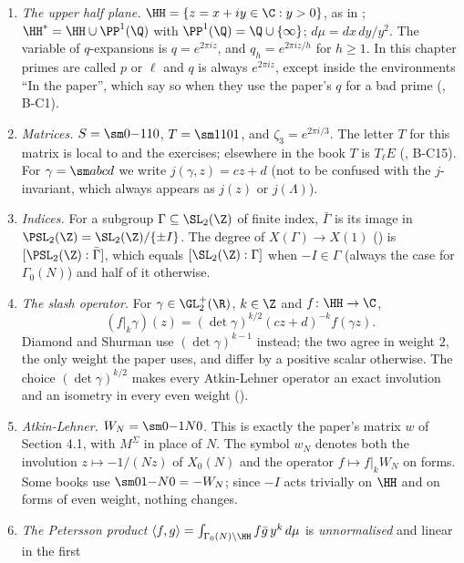 \begin{convention}\label{conv:modforms:conventions}
\leavevmode
\begin{enumerate}[label=(\alph*)]
\item \emph{The upper half plane.} $\HH=\{z=x+iy\in\C:y>0\}$, as in ; $\HH^*=\HH\cup\PP^1(\Q)$ with
$\PP^1(\Q)=\Q\cup\{\infty\}$; $d\mu=dx\,dy/y^2$. The variable of $q$-expansions is $q=e^{2\pi iz}$, and $q_h=e^{2\pi iz/h}$ for $h\ge1$. In
this chapter primes are called $p$ or $\ell$ and $q$ is always $e^{2\pi iz}$, except inside the environments ``In the paper'', which say
so when they use the paper's $q$ for a bad prime (, B-C1).
\item \emph{Matrices.} $S=\sm0{-1}10$, $T=\sm1101$, and $\zeta_3=e^{2\pi i/3}$. The letter $T$ for this matrix is local to
 and the exercises; elsewhere in the book $T$ is $T_\ell E$ (,
B-C15). For $\gamma=\sm abcd$ we write $j(\gamma,z)=cz+d$ (not to be confused with the $j$-invariant, which always appears as $j(z)$
or $j(\Lambda)$).
\item \emph{Indices.} For a subgroup $\Gamma\subseteq\SL_2(\Z)$ of finite index, $\bar\Gamma$ is its image in $\PSL_2(\Z)=\SL_2(\Z)/\{\pm I\}$. The degree
of $X(\Gamma)\to X(1)$ () is $[\PSL_2(\Z):\bar\Gamma]$, which equals $[\SL_2(\Z):\Gamma]$ when $-I\in\Gamma$ (always the case for
$\Gamma_0(N)$) and half of it otherwise.
\item \emph{The slash operator.} For $\gamma\in\GL_2^+(\R)$, $k\in\Z$ and $f\colon\HH\to\C$,
\[
(f|_k\gamma)(z)=(\det\gamma)^{k/2}(cz+d)^{-k}f(\gamma z).
\]
Diamond and Shurman \cite{DiamondShurman} use $(\det\gamma)^{k-1}$ instead; the two agree in weight $2$, the only weight the paper
uses, and differ by a positive scalar otherwise. The choice $(\det\gamma)^{k/2}$ makes every Atkin-Lehner operator an exact
involution and an isometry in every even weight ().
\item \emph{Atkin-Lehner.} $W_N=\sm0{-1}N0$. This is exactly the paper's matrix $w$ of Section 4.1, with $M^\Sigma$ in place of $N$. The
symbol $w_N$ denotes both the involution $z\mapsto-1/(Nz)$ of $X_0(N)$ and the operator $f\mapsto f|_kW_N$ on forms. Some books use
$\sm01{-N}0=-W_N$; since $-I$ acts trivially on $\HH$ and on forms of even weight, nothing changes.
\item \emph{The Petersson product} $\langle f,g\rangle=\int_{\Gamma_0(N)\backslash\HH}f\bar g\,y^k\,d\mu$ is \emph{unnormalised} and linear in the first

\end{enumerate}
\end{convention}
